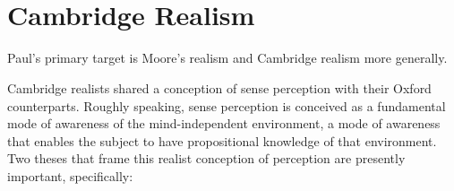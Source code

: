\documentclass[11pt]{article}
\title{\mytitle\\
\mysubtitle}
\author{\myauthor}
\date{} %
\begin{document}
\maketitle

\setlength{\parindent}{1em}


\section{Cambridge Realism} %
\label{sec:Cambridge_realism}
Paul's primary target is Moore's realism and Cambridge realism more generally.

Cambridge realists shared a conception of sense perception with their Oxford counterparts. Roughly speaking, sense perception is conceived as a fundamental mode of awareness of the mind-independent environment, a mode of awareness that enables the subject to have propositional knowledge of that environment. Two theses that frame this realist conception of perception are presently important, specifically:
\end{document}
